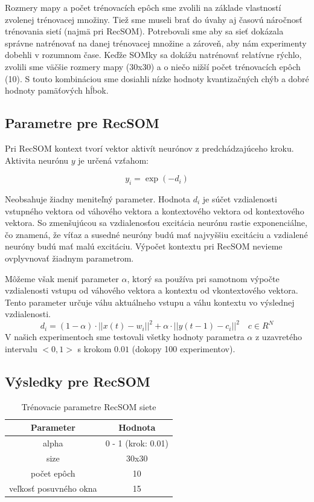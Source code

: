 Rozmery mapy a počet trénovacích epôch sme zvolili na základe vlastností zvolenej trénovacej množiny. 
Tiež sme museli brať do úvahy aj časovú náročnosť trénovania sietí (najmä pri RecSOM).
Potrebovali sme aby sa sieť dokázala správne natrénovať na danej trénovacej množine a zároveň, aby nám experimenty dobehli v rozumnom čase.
Keďže SOMky sa dokážu natrénovať relatívne rýchlo, zvolili sme väčšie rozmery mapy (30x30) a o niečo nižší počet trénovacích epôch (10).
S touto kombináciou sme dosiahli nízke hodnoty kvantizačných chýb a dobré hodnoty pamäťových hĺbok.


\subsection{Parametre pre RecSOM}
Pri RecSOM kontext tvorí vektor aktivít neurónov z predchádzajúceho kroku.
Aktivita neurónu $y$ je určená vzťahom:

\begin{equation}
    y_{i} = \exp{(-d_{i})}
\end{equation}

Neobsahuje žiadny meniteľný parameter. Hodnota $d_{i}$ je súčet vzdialenosti vstupného vektora od váhového vektora a kontextového vektora od 
kontextového vektora. So zmenšujúcou sa vzdialenosťou excitácia neurónu rastie exponenciálne, čo 
znamená, že víťaz a susedné neuróny budú mať najvyššiu excitáciu a vzdialené neuróny budú mať malú excitáciu.
Výpočet kontextu pri RecSOM nevieme ovplyvnovať žiadnym parametrom.

Môžeme však meniť parameter $\alpha$, ktorý sa používa pri samotnom výpočte vzdialenosti
vstupu od váhového vektora a kontextu od vkontextového vektora. Tento parameter určuje váhu aktuálneho vstupu a váhu kontextu
vo výslednej vzdialenosti.
\begin{equation}
	d_i = (1 - \alpha) \cdot ||x(t) - w_i||^{2} + \alpha \cdot ||y(t-1) - c_i||^{2} \quad c \in R^{N}
\end{equation}
V našich experimentoch sme testovali všetky hodnoty parametra $\alpha$ z uzavretého intervalu
$<0, 1>$ s krokom $0.01$ (dokopy 100 experimentov).

\subsection{Výsledky pre RecSOM}

\begin{table}[h!]
    \centering
    \begin{tabular}{|c|c|} 
     \hline
     Parameter & Hodnota \\ 
     \hline\hline
     alpha & 0 - 1  (krok: 0.01) \\ 
     \hline
     size & 30x30  \\
     \hline
     počet epôch & 10  \\
     \hline
     veľkosť posuvného okna & 15  \\
     \hline
    \end{tabular}
    \caption{Trénovacie parametre RecSOM siete}
    \label{table:1}
    \end{table}

